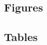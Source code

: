 \documentclass[utf8]{article}
\begin{document}

\subsection{Figures}


\subsection{Tables}
\end{document}
